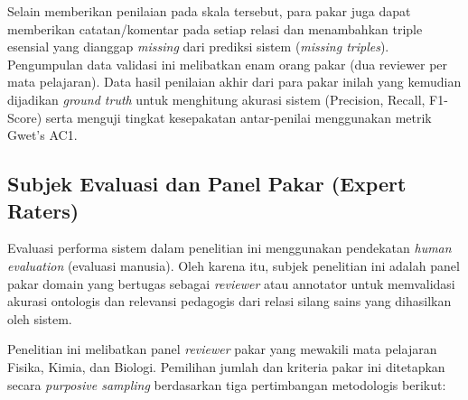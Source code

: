\documentclass[
]{article}
\begin{document}
Selain memberikan penilaian pada skala tersebut, para pakar juga dapat
memberikan catatan/komentar pada setiap relasi dan menambahkan triple
esensial yang dianggap \emph{missing} dari prediksi sistem
(\emph{missing triples}). Pengumpulan data validasi ini melibatkan enam
orang pakar (dua reviewer per mata pelajaran). Data hasil penilaian
akhir dari para pakar inilah yang kemudian dijadikan \emph{ground truth}
untuk menghitung akurasi sistem (Precision, Recall, F1-Score) serta
menguji tingkat kesepakatan antar-penilai menggunakan metrik Gwet's AC1.

\hypertarget{subjek-evaluasi-dan-panel-pakar-expert-raters}{%
\subsection{Subjek Evaluasi dan Panel Pakar (Expert
Raters)}\label{subjek-evaluasi-dan-panel-pakar-expert-raters}}

Evaluasi performa sistem dalam penelitian ini menggunakan pendekatan
\emph{human evaluation} (evaluasi manusia). Oleh karena itu, subjek
penelitian ini adalah panel pakar domain yang bertugas sebagai
\emph{reviewer} atau annotator untuk memvalidasi akurasi ontologis dan
relevansi pedagogis dari relasi silang sains yang dihasilkan oleh
sistem.

Penelitian ini melibatkan panel \emph{reviewer} pakar yang mewakili mata
pelajaran Fisika, Kimia, dan Biologi. Pemilihan jumlah dan kriteria
pakar ini ditetapkan secara \emph{purposive sampling} berdasarkan tiga
pertimbangan metodologis berikut:
\end{document}

